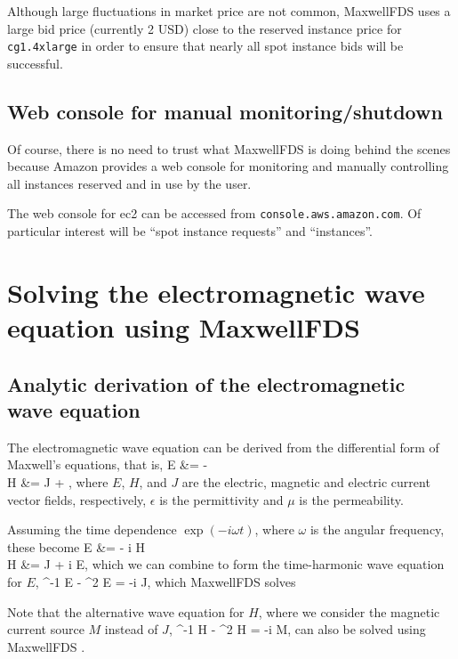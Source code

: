 \documentclass{article}
\newcommand{\MaxwellFDS}{MaxwellFDS }
\begin{document}
Although large fluctuations in market price are not common,
    \MaxwellFDS uses a large bid price (currently 2 USD) close to the
    reserved instance price for \texttt{cg1.4xlarge} 
    in order to ensure that nearly all spot instance bids will be successful.

\subsection{Web console for manual monitoring/shutdown}
Of course, there is no need to trust what \MaxwellFDS is doing behind the scenes
    because Amazon provides a web console for monitoring and 
    manually controlling all instances reserved and in use by the user.

The web console for ec2 can be accessed from \texttt{console.aws.amazon.com}.
Of particular interest will be ``spot instance requests'' and ``instances''.

\section{Solving the electromagnetic wave equation using \MaxwellFDS}
\subsection{Analytic derivation of the electromagnetic wave equation}
The electromagnetic wave equation can be derived from 
    the differential form of Maxwell's equations, that is,
    {\curl E &= - \mu {} \\
    \curl H &= J + \epsilon {}, }
    where $E$, $H$, and $J$ are 
    the electric, magnetic and electric current
    vector fields, respectively,
    $\epsilon$ is the permittivity
    and $\mu$ is the permeability.

Assuming the time dependence $\exp(-i \omega t)$, 
    where $\omega$ is the angular frequency,
    these become
    {\curl E &= - i \mu \omega H \\
    \curl H &= J + i \epsilon \omega E,}
    which we can combine to form the time-harmonic wave equation for $E$,
    {\curl \mu^{-1} \curl E - \epsilon \omega^2 E = -i \omega J,}
    which \MaxwellFDS solves

Note that the alternative wave equation for $H$,
    where we consider the magnetic current source $M$
    instead of $J$,
    {\curl \epsilon^{-1} \curl H - \mu \omega^2 H = -i \omega M,}
    can also be solved using \MaxwellFDS.
\end{document}
